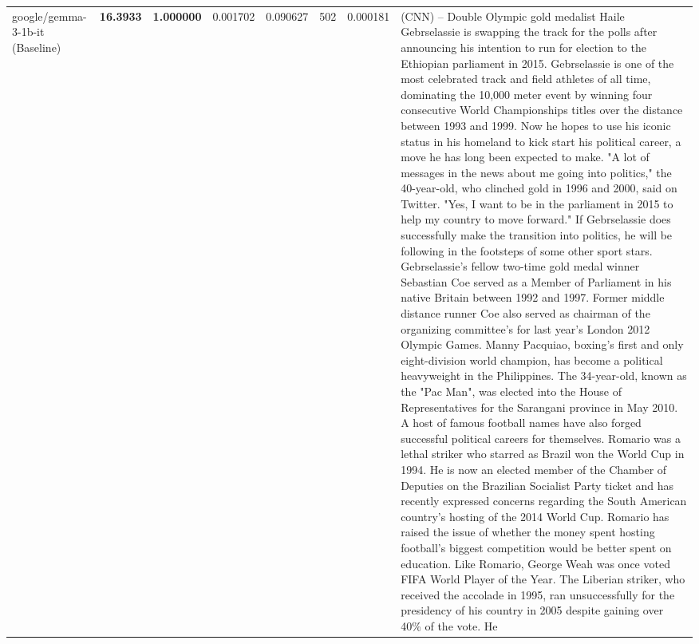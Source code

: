 \begin{table}[H]
{\begin{tabular}{llrlllll}
google/gemma-3-1b-it (Baseline) & \bfseries 16.3933 & \bfseries 1.000000 & 0.001702 & 0.090627 & 502 & 0.000181 & (CNN) -- Double Olympic gold medalist Haile Gebrselassie is swapping the track for the polls after announcing his intention to run for election to the Ethiopian parliament in 2015. Gebrselassie is one of the most celebrated track and field athletes of all time, dominating the 10,000 meter event by winning four consecutive World Championships titles over the distance between 1993 and 1999. Now he hopes to use his iconic status in his homeland to kick start his political career, a move he has long been expected to make. "A lot of messages in the news about me going into politics," the 40-year-old, who clinched gold in 1996 and 2000, said on Twitter. "Yes, I want to be in the parliament in 2015 to help my country to move forward." If Gebrselassie does successfully make the transition into politics, he will be following in the footsteps of some other sport stars. Gebrselassie's fellow two-time gold medal winner Sebastian Coe served as a Member of Parliament in his native Britain between 1992 and 1997. Former middle distance runner Coe also served as chairman of the organizing committee's for last year's London 2012 Olympic Games. Manny Pacquiao, boxing's first and only eight-division world champion, has become a political heavyweight in the Philippines. The 34-year-old, known as the "Pac Man", was elected into the House of Representatives for the Sarangani province in May 2010. A host of famous football names have also forged successful political careers for themselves. Romario was a lethal striker who starred as Brazil won the World Cup in 1994. He is now an elected member of the Chamber of Deputies on the Brazilian Socialist Party ticket and has recently expressed concerns regarding the South American country's hosting of the 2014 World Cup. Romario has raised the issue of whether the money spent hosting football's biggest competition would be better spent on education. Like Romario, George Weah was once voted FIFA World Player of the Year. The Liberian striker, who received the accolade in 1995, ran unsuccessfully for the presidency of his country in 2005 despite gaining over 40\% of the vote. He \\

\end{tabular}}
\end{table}
